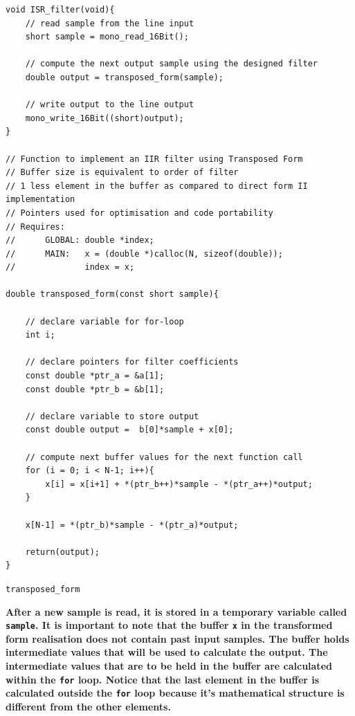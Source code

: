 \documentclass{article}
\begin{document}
\begin{listing}[H]
\begin{verbatim}
void ISR_filter(void){
    // read sample from the line input				
    short sample = mono_read_16Bit();
    
    // compute the next output sample using the designed filter
    double output = transposed_form(sample);
    
    // write output to the line output
    mono_write_16Bit((short)output);
}

// Function to implement an IIR filter using Transposed Form
// Buffer size is equivalent to order of filter
// 1 less element in the buffer as compared to direct form II implementation
// Pointers used for optimisation and code portability
// Requires:
//      GLOBAL: double *index;
//      MAIN:   x = (double *)calloc(N, sizeof(double));
//              index = x;

double transposed_form(const short sample){
    
    // declare variable for for-loop
    int i;
    
    // declare pointers for filter coefficients 
    const double *ptr_a = &a[1];
    const double *ptr_b = &b[1];
    
    // declare variable to store output
    const double output =  b[0]*sample + x[0];
    
    // compute next buffer values for the next function call
    for (i = 0; i < N-1; i++){
        x[i] = x[i+1] + *(ptr_b++)*sample - *(ptr_a++)*output;
    }
    
    x[N-1] = *(ptr_b)*sample - *(ptr_a)*output;
    
    return(output);	
}

\end{verbatim}
\caption{{\tt transposed\_form}} 
\label{lst:transposed_form}
\end{listing}

\textbf{After a new sample is read, it is stored in a temporary variable called {\tt sample}. It is important to note that the buffer {\tt x} in the transformed form realisation does not contain past input samples. The buffer holds intermediate values that will be used to calculate the output. The intermediate values that are to be held in the buffer are calculated within the {\tt for} loop. Notice that the last element in the buffer is calculated outside the {\tt for} loop because it's mathematical structure is different from the other elements.}\\
\end{document}
